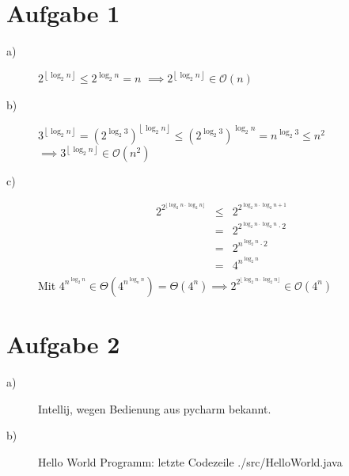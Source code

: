 
\newcommand{\dozent}{Prof. Dr. Claudia Müller-Birn, Barry Linnert}					%
\newcommand{\tutor}{Thierry Meurers}						%
\newcommand{\tutoriumNo}{10}				%
\newcommand{\ubungNo}{06}									%
\newcommand{\veranstaltung}{Objektorientierte Programmierung}	%
\newcommand{\semester}{SoSe 17}						%
\newcommand{\studenten}{Stefaan Hessmann, Jaap Pedersen, Mark Niehues}			%




\section{Aufgabe 1}
\begin{description}
\item[a)] 
$2^{\left\lfloor\log_2 n\right\rfloor} \le 2^{\log_2 n} = n$
$\implies 2^{\left\lfloor\log_2 n\right\rfloor} \in \mathcal{O} (n) $
\item[b)] 
$3^{\left\lfloor\log_2 n\right\rfloor}= (2^{\log_2 3})^{\left\lfloor\log_2 n\right\rfloor} \le (2^{\log_2 3})^{\log_2 n} = n^{\log_2 3} \le n^2 $
$\implies 3^{\left\lfloor\log_2 n\right\rfloor} \in \mathcal{O} (n^2) $
\item[c)]
\begin{eqnarray*}
2^{2^{\lfloor \log_2 n \cdot \log_2 n \rfloor}}  &\le & 2^{2^{\log_2 n \cdot \log_2 n + 1}} \\
	& = & 2^{2^{\log_2 n \cdot \log_2 n} \cdot 2} \\
	& = & 2^{n^{\log_2 n} \cdot 2} \\
	& = & 4^{n^{\log_2 n}} \\
\end{eqnarray*}
Mit $ 4^{n^{\log_2 n}} \in \Theta (4^{n^{\log_n n}}) = \Theta (4^{n}) \implies 2^{2^{\lfloor \log_2 n \cdot \log_2 n \rfloor}} \in  \mathcal{O} (4^n)$


\end{description}

\section{Aufgabe 2}
\begin{description}
\item[a)]
Intellij, wegen Bedienung aus pycharm bekannt. 
\item[b)]
Hello World Programm:
 letzte Codezeile
{./src/HelloWorld.java}

\end{description}


